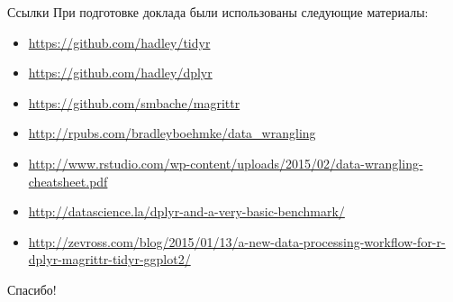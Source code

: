 \documentclass[compress, ucs]{beamer}\usepackage[]{graphicx}\usepackage[]{color}
\begin{document}
\begin{frame}{Ссылки}
При подготовке доклада были использованы следующие материалы:
\footnotesize{
\begin{itemize}
\item \url{https://github.com/hadley/tidyr}
\item \url{https://github.com/hadley/dplyr}
\item \url{https://github.com/smbache/magrittr}
\pause
\item \url{http://rpubs.com/bradleyboehmke/data_wrangling}
\item \url{http://www.rstudio.com/wp-content/uploads/2015/02/data-wrangling-cheatsheet.pdf}
\pause
\item \url{http://datascience.la/dplyr-and-a-very-basic-benchmark/}
\item \url{http://zevross.com/blog/2015/01/13/a-new-data-processing-workflow-for-r-dplyr-magrittr-tidyr-ggplot2/}
\end{itemize}
\pause
\begin{center}
\Large{Спасибо!}
\end{center}
}
\end{frame}
\end{document}
